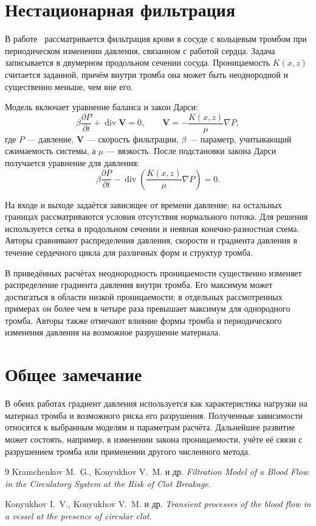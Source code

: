 \documentclass[a4paper,14pt]{extarticle}
\begin{document}
	\section{Нестационарная фильтрация}
	
	В работе~\cite{transient} рассматривается фильтрация крови
	в сосуде с кольцевым тромбом при периодическом изменении
	давления, связанном с работой сердца. Задача записывается в
	двумерном продольном сечении сосуда. Проницаемость $K(x,z)$
	считается заданной, причём внутри тромба она может быть
	неоднородной и существенно меньше, чем вне его.
	
	Модель включает уравнение баланса и закон Дарси:
	\begin{equation}
		\beta\frac{\partial P}{\partial t}
		+\operatorname{div}\mathbf V=0,
		\qquad
		\mathbf V=-\frac{K(x,z)}{\mu}\nabla P,
	\end{equation}
	где $P$ --- давление, $\mathbf V$ --- скорость фильтрации,
	$\beta$ --- параметр, учитывающий сжимаемость системы, а
	$\mu$ --- вязкость. После подстановки закона Дарси получается
	уравнение для давления:
	\begin{equation}
		\beta\frac{\partial P}{\partial t}
		-\operatorname{div}\left(\frac{K(x,z)}{\mu}\nabla P\right)=0.
	\end{equation}
	
	На входе и выходе задаётся зависящее от времени давление;
	на остальных границах рассматриваются условия отсутствия
	нормального потока. Для решения используется сетка в
	продольном сечении и неявная конечно-разностная схема.
	Авторы сравнивают распределения давления, скорости и
	градиента давления в течение сердечного цикла для различных
	форм и структур тромба.
	
	В приведённых расчётах неоднородность проницаемости
	существенно изменяет распределение градиента давления
	внутри тромба. Его максимум может достигаться в области
	низкой проницаемости; в отдельных рассмотренных примерах
	он более чем в четыре раза превышает максимум для
	однородного тромба. Авторы также отмечают влияние формы
	тромба и периодического изменения давления на возможное
	разрушение материала.
	
	\section{Общее замечание}
	
	В обеих работах градиент давления используется как
	характеристика нагрузки на материал тромба и возможного
	риска его разрушения. Полученные зависимости относятся к
	выбранным моделям и параметрам расчёта. Дальнейшее развитие
	может состоять, например, в изменении закона проницаемости,
	учёте её связи с разрушением тромба или применении другого
	численного метода.
	
	\begin{thebibliography}{9}
		Kramchenkov M.~G., Konyukhov V.~M. и др.
		\textit{Filtration Model of a Blood Flow in the Circulatory
			System at the Risk of Clot Breakage}.
		
		Konyukhov I.~V., Konyukhov V.~M. и др.
		\textit{Transient processes of the blood flow in a vessel at
			the presence of circular clot}.
	\end{thebibliography}
	
\end{document}
